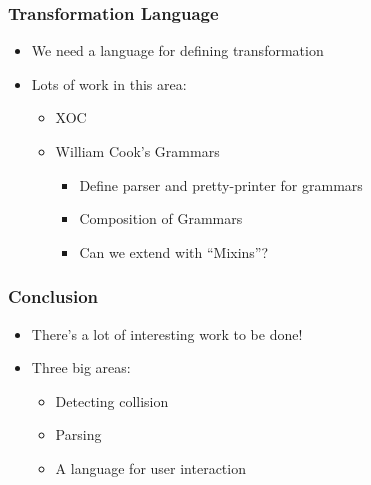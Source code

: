 \documentclass[bigger]{beamer}
\begin{document}
\begin{frame}
\frametitle{Transformation Language}
\label{sec-8}


\begin{itemize}
\item We need a language for defining transformation
\item Lots of work in this area:
\begin{itemize}
\item XOC
\item William Cook's Grammars
\begin{itemize}
\item Define parser and pretty-printer for grammars
\item Composition of Grammars
\item Can we extend with ``Mixins''?
\end{itemize}
\end{itemize}
\end{itemize}
\end{frame}
\begin{frame}
\frametitle{Conclusion}
\label{sec-9}


\begin{itemize}
\item There's a lot of interesting work to be done!
\item Three big areas:
\begin{itemize}
\item Detecting collision
\item Parsing
\item A language for user interaction
\end{itemize}
\end{itemize}
\end{frame}
\end{document}
